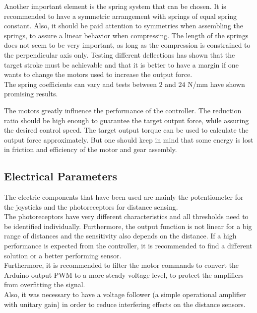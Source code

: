 Another important element is the spring system that can be chosen. It is recommended to have a symmetric arrangement with springs of equal spring constant. Also, it should be paid attention to symmetries when assembling the springs, to assure a linear behavior when compressing. The length of the springs does not seem to be very important, as long as the compression is constrained to the perpendicular axis only. Testing different deflections has shown that the target stroke must be achievable and that it is better to have a margin if one wants to change the motors used to increase the output force.\\
The spring coefficients can vary and tests between $2$ and $24$ N/mm have shown promising results. %

The motors greatly influence the performance of the controller. The reduction ratio should be high enough to guarantee the target output force, while assuring the desired control speed. The target output torque can be used to calculate the output force approximately. But one should keep in mind that some energy is lost in friction and efficiency of the motor and gear assembly.

\subsection{Electrical Parameters}
The electric components that have been used are mainly the potentiometer for the joysticks and the photoreceptors for distance sensing.\\
The photoreceptors have very different characteristics and all thresholds need to be identified individually. Furthermore, the output function is not linear for a big range of distances and the sensitivity also depends on the distance. If a high performance is expected from the controller, it is recommended to find a different solution or a better performing sensor.\\
Furthermore, it is recommended to filter the motor commands to convert the Arduino output PWM to a more steady voltage level, to protect the amplifiers from overfitting the signal.\\
Also, it was necessary to have a voltage follower (a simple operational amplifier with unitary gain) in order to reduce interfering effects on the distance sensors.

